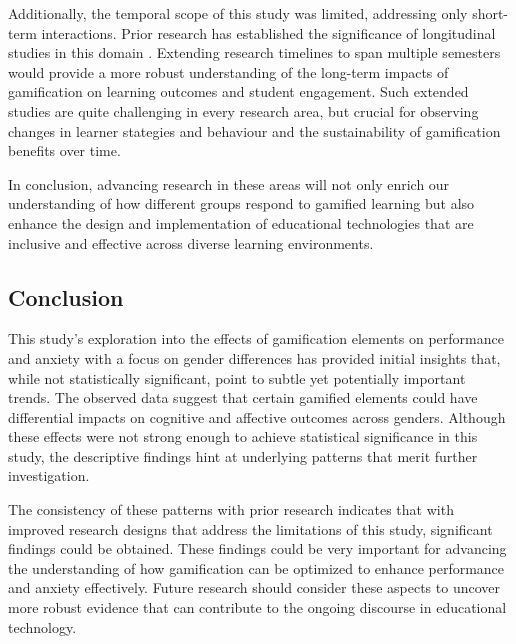 Additionally, the temporal scope of this study was limited, addressing only short-term interactions. Prior research has established the significance of longitudinal studies in this domain \parencite{oliveiraTailoredGamificationEducation2023,dehghanzadehUsingGamificationSupport2024}. Extending research timelines to span multiple semesters would provide a more robust understanding of the long-term impacts of gamification on learning outcomes and student engagement. Such extended studies are quite challenging in every research area, but crucial for observing changes in learner stategies and behaviour and the sustainability of gamification benefits over time.

In conclusion, advancing research in these areas will not only enrich our understanding of how different groups respond to gamified learning but also enhance the design and implementation of educational technologies that are inclusive and effective across diverse learning environments.

\subsection*{Conclusion}
This study's exploration into the effects of gamification elements on performance and anxiety with a focus on gender differences has provided initial insights that, while not statistically significant, point to subtle yet potentially important trends.
The observed data suggest that certain gamified elements could have differential impacts on cognitive and affective outcomes across genders.
Although these effects were not strong enough to achieve statistical significance in this study, the descriptive findings hint at underlying patterns that merit further investigation.

The consistency of these patterns with prior research indicates that with improved research designs that address the limitations of this study, significant findings could be obtained.
These findings could be very important for advancing the understanding of how gamification can be optimized to enhance performance and anxiety effectively.
Future research should consider these aspects to uncover more robust evidence that can contribute to the ongoing discourse in educational technology.
